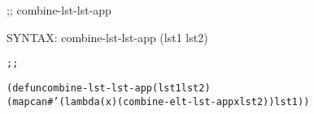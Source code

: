 \begin{aibox}{\function}
;; combine-lst-lst-app

SYNTAX: combine-lst-lst-app (lst1 lst2)
\end{aibox}

\begin{aibox}{\examples}

\end{aibox}

\begin{aibox}{\comments}

\end{aibox}
\begin{aibox}{\answers}

\end{aibox}
\begin{aibox}{\othercomments}

\end{aibox}
\begin{aibox}{\pseudocode}

\end{aibox}
\begin{aibox}{\code}

\begin{alltt}
;;%% code

(defun combine-lst-lst-app (lst1 lst2)
            (mapcan #'(lambda (x) (combine-elt-lst-app x lst2)) lst1))

\end{alltt}
\end{aibox}
